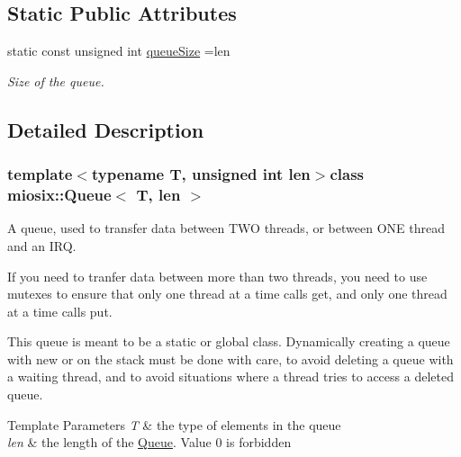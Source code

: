\subsection*{Static Public Attributes}
\begin{DoxyCompactItemize}
\item 
\hypertarget{classmiosix_1_1_queue_a357f2c83da89ce3a526475cbf1e13be8}{static const unsigned int \hyperlink{classmiosix_1_1_queue_a357f2c83da89ce3a526475cbf1e13be8}{queue\-Size} =len}\label{classmiosix_1_1_queue_a357f2c83da89ce3a526475cbf1e13be8}

\begin{DoxyCompactList}\small\item\em Size of the queue. \end{DoxyCompactList}\end{DoxyCompactItemize}


\subsection{Detailed Description}
\subsubsection*{template$<$typename T, unsigned int len$>$class miosix\-::\-Queue$<$ T, len $>$}

A queue, used to transfer data between T\-W\-O threads, or between O\-N\-E thread and an I\-R\-Q.\par
 If you need to tranfer data between more than two threads, you need to use mutexes to ensure that only one thread at a time calls get, and only one thread at a time calls put.\par
 This queue is meant to be a static or global class. Dynamically creating a queue with new or on the stack must be done with care, to avoid deleting a queue with a waiting thread, and to avoid situations where a thread tries to access a deleted queue. 
\begin{DoxyTemplParams}{Template Parameters}
{\em T} & the type of elements in the queue \\
\hline
{\em len} & the length of the \hyperlink{classmiosix_1_1_queue}{Queue}. Value 0 is forbidden \\
\hline
\end{DoxyTemplParams}


